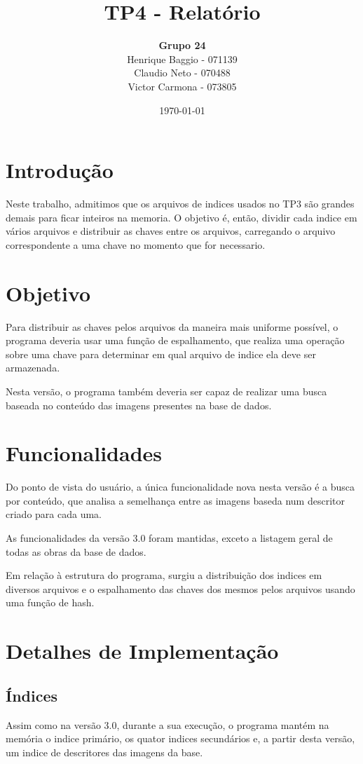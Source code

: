 \documentclass[10pt,a4paper,draft]{article}
\title{\textbf{TP4 - Relatório}}
\author{\textbf{Grupo 24} \\
 Henrique Baggio - 071139 \\
 Claudio Neto    - 070488 \\
 Victor Carmona  - 073805}
\date{\today}
\begin{document}
\maketitle

\section{Introdução}
Neste trabalho, admitimos que os arquivos de indices usados no TP3 são grandes
demais para ficar inteiros na memoria. O objetivo é, então, dividir cada
indice em vários arquivos e distribuir as chaves entre os arquivos,
carregando o arquivo correspondente a uma chave no momento que for
necessario.

\section{Objetivo}
Para distribuir as chaves pelos arquivos da maneira mais uniforme possível,
o programa deveria usar uma função de espalhamento, que realiza uma operação
sobre uma chave para determinar em qual arquivo de indice ela deve ser armazenada.

Nesta versão, o programa também deveria ser capaz de realizar uma busca baseada
no conteúdo das imagens presentes na base de dados.

\section{Funcionalidades}
Do ponto de vista do usuário, a única funcionalidade nova nesta versão é a
busca por conteúdo, que analisa a semelhança entre as imagens baseda num
descritor criado para cada uma.

As funcionalidades da versão 3.0 foram mantidas, exceto a listagem geral de
todas as obras da base de dados.

Em relação à estrutura do programa, surgiu a distribuição dos indices em
diversos arquivos e o espalhamento das chaves dos mesmos pelos arquivos usando
uma função de hash.

\newpage 
\section{Detalhes de Implementação}

\subsection{Índices}
Assim como na versão 3.0, durante a sua execução, o programa mantém na memória
o indice primário, os quator indices secundários e, a partir desta versão, um
indice de descritores das imagens da base.
\end{document}

